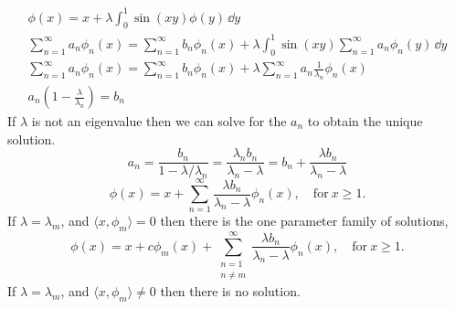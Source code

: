 \begin{Solution}
\begin{enumerate}
    \begin{gather*}
      \phi(x) = x + \lambda \int_0^1 \sin(x y) \phi(y) \,\dd y \\
      \sum_{n = 1}^\infty a_n \phi_n(x) = \sum_{n = 1}^\infty b_n \phi_n(x) 
      + \lambda \int_0^1 \sin(x y) \sum_{n = 1}^\infty a_n \phi_n(y) \,\dd y \\
      \sum_{n = 1}^\infty a_n \phi_n(x) = \sum_{n = 1}^\infty b_n \phi_n(x) 
      + \lambda \sum_{n = 1}^\infty a_n \frac{1}{\lambda_n} \phi_n(x) \\
      a_n \left( 1 - \frac{\lambda}{\lambda_n} \right) = b_n
    \end{gather*}
    If $\lambda$ is not an eigenvalue then we can solve for the $a_n$ to 
    obtain the unique solution.
    \[
    a_n = \frac{ b_n }{ 1 - \lambda / \lambda_n }
    = \frac{ \lambda_n b_n }{ \lambda_n - \lambda}
    = b_n + \frac{ \lambda b_n }{ \lambda_n - \lambda}
    \]
    \[
    \boxed{
      \phi(x) = x + \sum_{n = 1}^\infty \frac{ \lambda b_n }{ \lambda_n - \lambda } \phi_n(x),
      \quad \mathrm{for}\ x \geq 1.
      }
    \]
    If $\lambda = \lambda_m$, and $\langle x, \phi_m \rangle = 0$ then there is 
    the one parameter family of solutions,
    \[
    \boxed{
      \phi(x) = x + c \phi_m(x) + \sum_{\substack{n = 1 \\ n \neq m}}^\infty
      \frac{ \lambda b_n }{ \lambda_n - \lambda } \phi_n(x),
      \quad \mathrm{for}\ x \geq 1.
      }
    \]
    If $\lambda = \lambda_m$, and $\langle x, \phi_m \rangle \neq 0$ then there is 
    no solution.
  \end{enumerate}
\end{Solution}



